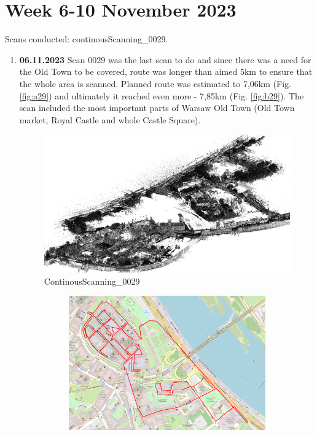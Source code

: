 \documentclass[a4paper,12pt]{book}
\begin{document}
\section{Week 6-10 November 2023}
Scans conducted: continousScanning\_0029.\\
\begin{enumerate}
	\item \textbf{06.11.2023} Scan 0029 was the last scan to do and since there was a need for the Old Town to be covered, route was longer than aimed 5km to ensure that the whole area is scanned. Planned route was estimated to 7,06km (Fig. \ref{fig:a29}) and ultimately it reached even more - 7,85km (Fig. \ref{fig:b29}). The scan included the most important parts of Warsaw Old Town (Old Town market, Royal Castle and whole Castle Square).
	\begin{figure}[H]
		\includegraphics[width=1\linewidth]{cloud29}
		\caption{ContinousScanning\_0029}
	\end{figure}
	\begin{figure}[H]
		\centering
		\begin{subfigure}{.95\textwidth}
			\centering
			\includegraphics[width=1\linewidth]{route_p29}

\end{subfigure}
\end{figure}
\end{enumerate}
\end{document}

